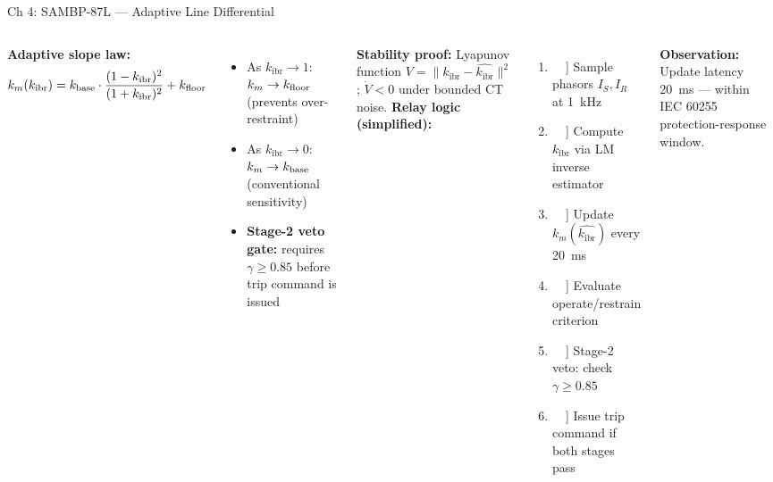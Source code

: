 \documentclass[10pt,aspectratio=169]{beamer}
\newcommand{\bitem}[1]{%
  \makebox[16pt]{\textcolor{white}{\colorbox{iitmblue}{\bfseries\scriptsize#1}}}\,%
}
\newcommand{\obs}[1]{%
  {\color{iitmred}\textbf{Observation:} #1}%
}
\newcommand{\kibr}{k_{\mathrm{ibr}}}
\begin{document}
\begin{frame}{Ch 4: SAMBP-87L — Adaptive Line Differential}
  \begin{columns}[T]
      \textbf{Adaptive slope law:}
      \[
        k_m(\kibr) = k_{\rm base}
          \cdot \frac{(1-\kibr)^2}{(1+\kibr)^2}
          + k_{\rm floor}
      \]
      \begin{itemize}\itemsep3pt
        \item As $\kibr \to 1$: $k_m \to k_{\rm floor}$ (prevents over-restraint)
        \item As $\kibr \to 0$: $k_m \to k_{\rm base}$ (conventional sensitivity)
        \item \textbf{Stage-2 veto gate:} requires $\gamma \geq 0.85$
          before trip command is issued
      \end{itemize}
      \vspace{0.3cm}
      \textbf{Stability proof:}
      Lyapunov function $V = \|\kibr - \hat{\kibr}\|^2$;
      $\dot{V} < 0$ under bounded CT noise.
      \textbf{Relay logic (simplified):}
      \vspace{0.2cm}
      \begin{enumerate}\itemsep4pt
        \item[\bitem{1}] Sample phasors $I_S, I_R$ at 1~kHz
        \item[\bitem{2}] Compute $\kibr$ via LM inverse estimator
        \item[\bitem{3}] Update $k_m(\hat{\kibr})$ every 20~ms
        \item[\bitem{4}] Evaluate operate/restrain criterion
        \item[\bitem{5}] Stage-2 veto: check $\gamma \geq 0.85$
        \item[\bitem{6}] Issue trip command if both stages pass
      \end{enumerate}
      \vspace{0.2cm}
      \obs{Update latency 20~ms — within IEC 60255
        protection-response window.}
  \end{columns}
\end{frame}
\end{document}
